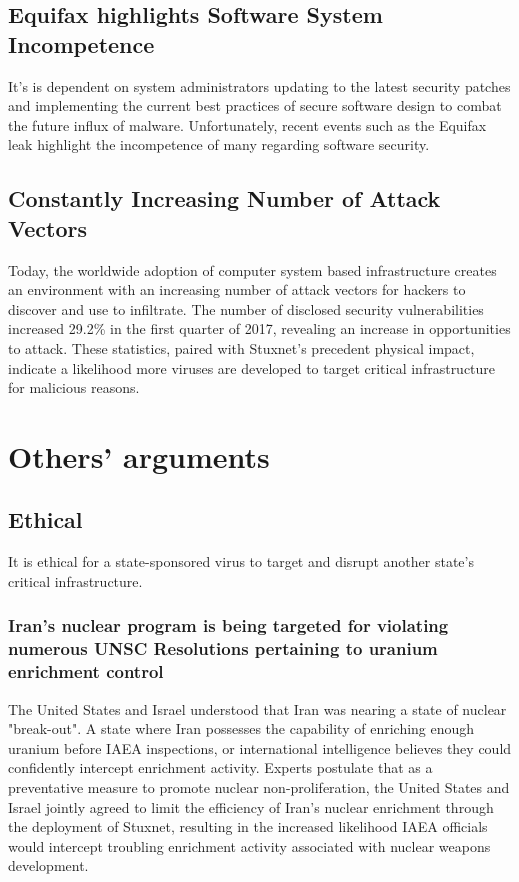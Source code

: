 \documentclass[12pt]{article}
\begin{document}
\begin{multicols}{2}
\subsection{Equifax highlights Software System Incompetence}

It's is dependent on system administrators updating to the latest security patches and implementing the current best practices of secure software design to combat the future influx of malware. Unfortunately, recent events such as the Equifax leak highlight the incompetence of many regarding software security.\cite{equifaxHack}

\subsection{Constantly Increasing Number of Attack Vectors}

Today, the worldwide adoption of computer system based infrastructure creates an environment with an increasing number of attack vectors for hackers to discover and use to infiltrate. The number of disclosed security vulnerabilities increased 29.2\% in the first quarter of 2017, revealing an increase in opportunities to attack. These statistics, paired with Stuxnet's precedent physical impact, indicate a likelihood more viruses are developed to target critical infrastructure for malicious reasons.\cite{industrialCyberVulnerabilities}

\section{Others' arguments}

\subsection{Ethical}

It is ethical for a state-sponsored virus to target and disrupt another state's critical infrastructure.

\subsubsection{Iran's nuclear program is being targeted for violating numerous UNSC Resolutions pertaining to uranium enrichment control}

The United States and Israel understood that Iran was nearing a state of nuclear "break-out". A state where Iran possesses the capability of enriching enough uranium before IAEA inspections, or international intelligence believes they could confidently intercept enrichment activity. Experts postulate that as a preventative measure to promote nuclear non-proliferation, the United States and Israel jointly agreed to limit the efficiency of Iran's nuclear enrichment through the deployment of Stuxnet, resulting in the increased likelihood IAEA officials would intercept troubling enrichment activity associated with nuclear weapons development.\cite{theRealStoryOfStuxnet}


\end{multicols}
\end{document}

